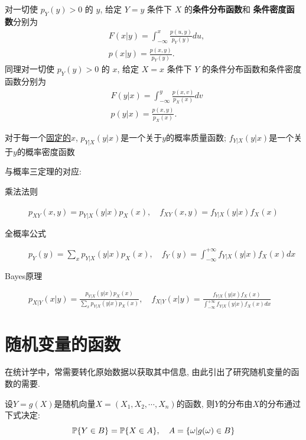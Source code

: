 \begin{definition}
    对一切使 $p_Y(y)>0$ 的 $y$, 给定 $Y=y$ 条件下 $X$ 的\textbf{条件分布函数}和
    \textbf{条件密度函数}分别为
    \begin{align}
         & F(x | y)=\int_{-\infty}^{x} \frac{p(u, y)}{p_{Y}(y)} du, \\
         & p(x | y)=\frac{p(x, y)}{p_{Y}(y)}.
    \end{align}
    同理对一切使 $p_Y(y)>0$ 的 $x$, 给定 $X=x$ 条件下 $Y$ 的条件分布函数和条件密度函数分别为
    \begin{align}
         & F(y | x)=\int_{-\infty}^{y} \frac{p(x, v)}{p_{X}(x)} dv \\
         & p(y | x)=\frac{p(x, y)}{p_{X}(x)}.
    \end{align}
\end{definition}

\begin{remark}
    对于每一个\underline{固定的$x$}, $p_{Y|X}(y|x)$是一个关于$y$的概率质量函数; $f_{Y|X}(y|x)$是一个关于$y$的概率密度函数
\end{remark}

与概率三定理的对应:
\begin{description}
    \item[乘法法则] $p_{XY}(x,y)=p_{Y|X}(y|x)p_{X}(x), \quad f_{XY}(x,y)=f_{Y|X}(y|x)f_{X}(x)$
    \item[全概率公式] $p_{Y}(y)=\sum_{x}p_{Y|X}(y|x)p_{X}(x), \quad f_{Y}(y)=\int^{+\infty}_{-\infty}f_{Y|X}(y|x)f_{X}(x)dx$
    \item[Bayes原理]  $p_{X|Y}(x|y)=\frac{p_{Y|X}(y|x)p_{X}(x)}{\sum_{x}p_{Y|X}(y|x)p_{X}(x)}, \quad f_{X|Y}(x|y)=\frac{f_{Y|X}(y|x)f_{X}(x)}{\int^{+\infty}_{-\infty}f_{Y|X}(y|x)f_{X}(x)dx}$
\end{description}

\section{随机变量的函数}

在统计学中，常需要转化原始数据以获取其中信息, 由此引出了研究随机变量的函数的需要.

\begin{theorem}[事件法]
    设$Y=g(X)$是随机向量$X=(X_1,X_2,\cdots ,X_n)$的函数, 则$Y$的分布由$X$的分布通过下式决定:
    \[ \P\{Y \in B\} = \P\{X \in A\}, \quad A=\{ \omega |g(\omega)\in B\} \]
\end{theorem}

